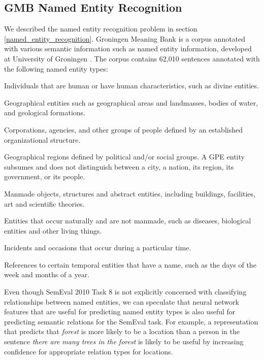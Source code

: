 \subsection{GMB Named Entity Recognition}
We described the named entity recognition problem in section \ref{named_entity_recognition}. Groningen Meaning Bank is a corpus annotated with various semantic information such as named entity information, developed at University of Groningen \citep{basile2012}. The corpus contains 62,010 sentences annotated with the following named entity types:

\begin{description}[labelindent=4em, leftmargin=4em]
	\item [Person] Individuals that are human or have human characteristics, such as divine entities.
	\item [Location]  Geographical entities such as geographical areas and landmasses, bodies of water, and geological formations.
	\item [Organization] Corporations, agencies, and other groups of people defined by an established organizational structure.
	\item [Geo-Political Entity] Geographical regions defined by political and/or social groups. A GPE entity subsumes and does not distinguish between a city, a nation, its region, its government, or its people.
	\item [Artifact] Manmade objects, structures and abstract entities, including buildings, facilities, art and scientific theories.
	\item [Natural Object] Entities that occur naturally and are not manmade, such as diseases, biological entities and other living things.
	\item [Event] Incidents and occasions that occur during a particular time.
	\item [Time] References to certain temporal entities that have a name, such as the days of the week and months of a year.
\end{description}
\noindent
Even though SemEval 2010 Task 8 is not explicitly concerned with classifying relationships between named entities, we can speculate that neural network features that are useful for predicting named entity types is also useful for predicting semantic relations for the SemEval task. For example, a representation that predicts that \textit{forest} is more likely to be a location than a person in the sentence \textit{there are many trees in the forest} is likely to be useful by increasing confidence for appropriate relation types for locations.